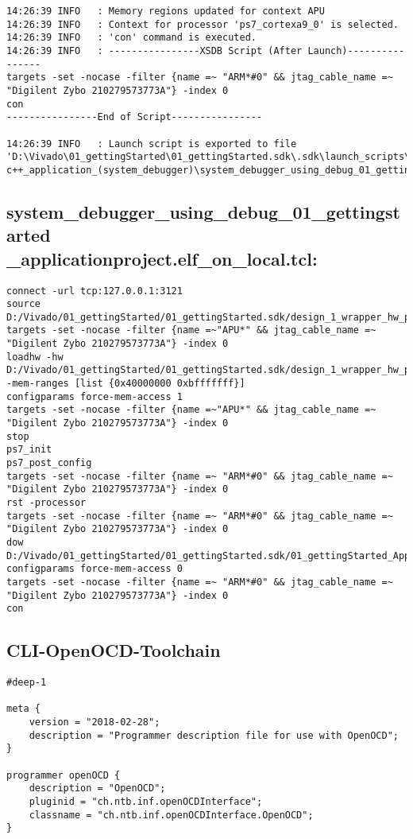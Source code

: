 \begin{lstlisting}
14:26:39 INFO	: Memory regions updated for context APU
14:26:39 INFO	: Context for processor 'ps7_cortexa9_0' is selected.
14:26:39 INFO	: 'con' command is executed.
14:26:39 INFO	: ----------------XSDB Script (After Launch)----------------
targets -set -nocase -filter {name =~ "ARM*#0" && jtag_cable_name =~ "Digilent Zybo 210279573773A"} -index 0
con
----------------End of Script----------------

14:26:39 INFO	: Launch script is exported to file 'D:\Vivado\01_gettingStarted\01_gettingStarted.sdk\.sdk\launch_scripts\xilinx_c-c++_application_(system_debugger)\system_debugger_using_debug_01_gettingstarted_applicationproject.elf_on_local.tcl'
\end{lstlisting}


\subsection{system\_debugger\_using\_debug\_01\_gettingstarted\\\_applicationproject.elf\_on\_local.tcl:}
\label{anhang:elf_on_local.tcl}
\lstset{language=plain}
\begin{lstlisting}
connect -url tcp:127.0.0.1:3121
source D:/Vivado/01_gettingStarted/01_gettingStarted.sdk/design_1_wrapper_hw_platform_0/ps7_init.tcl
targets -set -nocase -filter {name =~"APU*" && jtag_cable_name =~ "Digilent Zybo 210279573773A"} -index 0
loadhw -hw D:/Vivado/01_gettingStarted/01_gettingStarted.sdk/design_1_wrapper_hw_platform_0/system.hdf -mem-ranges [list {0x40000000 0xbfffffff}]
configparams force-mem-access 1
targets -set -nocase -filter {name =~"APU*" && jtag_cable_name =~ "Digilent Zybo 210279573773A"} -index 0
stop
ps7_init
ps7_post_config
targets -set -nocase -filter {name =~ "ARM*#0" && jtag_cable_name =~ "Digilent Zybo 210279573773A"} -index 0
rst -processor
targets -set -nocase -filter {name =~ "ARM*#0" && jtag_cable_name =~ "Digilent Zybo 210279573773A"} -index 0
dow D:/Vivado/01_gettingStarted/01_gettingStarted.sdk/01_gettingStarted_ApplicationProject/Debug/01_gettingStarted_ApplicationProject.elf
configparams force-mem-access 0
targets -set -nocase -filter {name =~ "ARM*#0" && jtag_cable_name =~ "Digilent Zybo 210279573773A"} -index 0
con
\end{lstlisting}


\subsection{CLI-OpenOCD-Toolchain}
\label{anhang:CLI-OpenOCD-Toolchain}
\lstset{language=java}
\begin{lstlisting}
#deep-1

meta {
	version = "2018-02-28";
	description = "Programmer description file for use with OpenOCD";
}

programmer openOCD {
	description = "OpenOCD";
	pluginid = "ch.ntb.inf.openOCDInterface";
	classname = "ch.ntb.inf.openOCDInterface.OpenOCD";
}
\end{lstlisting}






